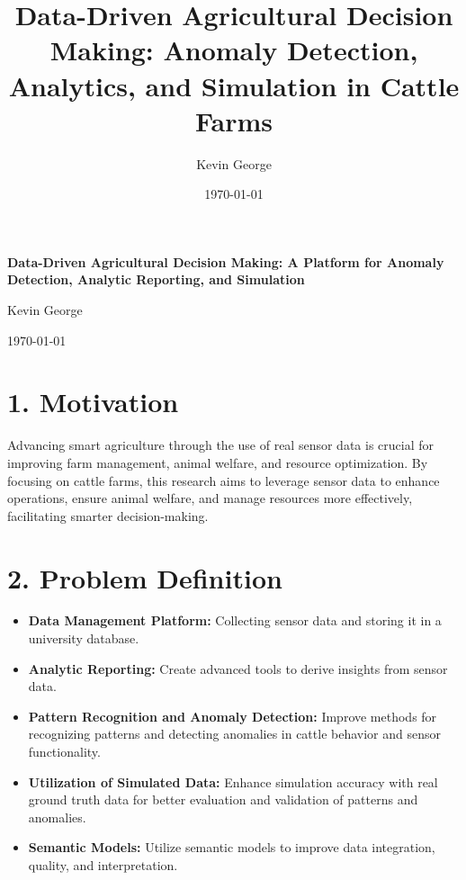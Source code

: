 \documentclass[11pt]{article}
\title{Data-Driven Agricultural Decision Making: Anomaly Detection, Analytics, and Simulation in Cattle Farms}
\author{Kevin George}
\date{\today}
\begin{document}
\begin{titlepage}
    \centering
    \vspace*{0.3in}
    \LARGE\textbf{Data-Driven Agricultural Decision Making: A Platform for Anomaly Detection, Analytic Reporting, and Simulation}\par
    \vspace{0.5in}
    \large Kevin George\par
    \vspace{0.2in}
    \normalsize \today
    \thispagestyle{empty}
\end{titlepage}

\section*{1. Motivation}
Advancing smart agriculture through the use of real sensor data is crucial for improving farm management, animal welfare, and resource optimization. By focusing on cattle farms, this research aims to leverage sensor data to enhance operations, ensure animal welfare, and manage resources more effectively, facilitating smarter decision-making.

\section*{2. Problem Definition}
\begin{itemize}
    \item \textbf{Data Management Platform:} Collecting sensor data and storing it in a university database.
    \item \textbf{Analytic Reporting:} Create advanced tools to derive insights from sensor data.
    \item \textbf{Pattern Recognition and Anomaly Detection:} Improve methods for recognizing patterns and detecting anomalies in cattle behavior and sensor functionality.
    \item \textbf{Utilization of Simulated Data:} Enhance simulation accuracy with real ground truth data for better evaluation and validation of patterns and anomalies.
    \item \textbf{Semantic Models:} Utilize semantic models to improve data integration, quality, and interpretation.
\end{itemize}
\end{document}
